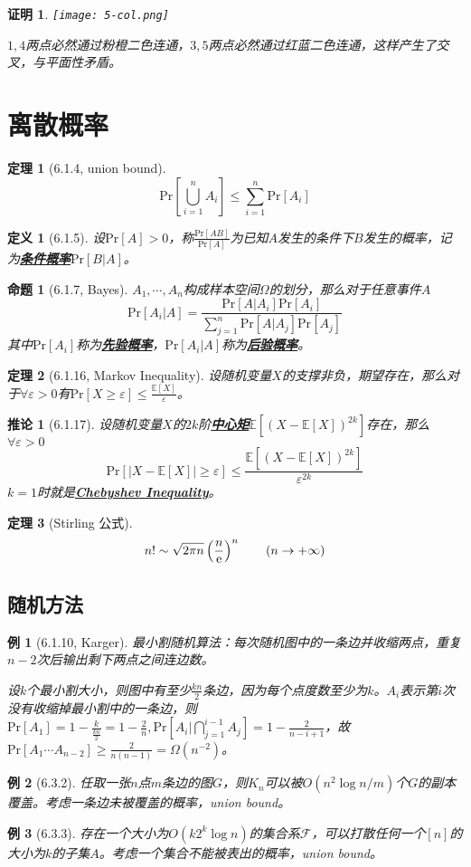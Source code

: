 \documentclass[landscape, a4paper]{article}
\theoremstyle{compact}
\newtheorem{theorem}{定理}
\newtheorem{example}{例}
\newtheorem{corollary}{推论}
\newtheorem{definition}{定义}
\newtheorem{proposition}{命题}
\newtheorem{Proof}{证明}
\def\obj#1{\textbf{\uline{#1}}}
\def\le{\leqslant}
\def\ge{\geqslant}
\def\Pr#1{\text{Pr}[{#1}]}
\def\E#1{\mathbb{E}[{#1}]}
\begin{document}
\begin{multicols}{3}
\begin{Proof}
	\texttt{[image: 5-col.png]}
	
	$1, 4$两点必然通过粉橙二色连通，$3, 5$两点必然通过红蓝二色连通，这样产生了交叉，与平面性矛盾。
\end{Proof}

\section{离散概率}
\begin{theorem}[6.1.4, union bound]
	$$\text{Pr}\left[\bigcup_{i=1}^{n}A_i\right] \le \sum_{i=1}^{n}\Pr{A_i}$$
\end{theorem}
\begin{definition}[6.1.5]
	设$\Pr{A} > 0$，称$\frac{\Pr{AB}}{\Pr{A}}$为已知$A$发生的条件下$B$发生的概率，记为\obj{条件概率}$\Pr{B|A}$。
\end{definition}
\begin{proposition}[6.1.7, Bayes]
	$A_1, \cdots, A_n$构成样本空间$\Omega$的划分，那么对于任意事件$A$
	$$\Pr{A_i | A} = \frac{\Pr{A | A_i}\Pr{A_i}}{\sum_{j=1}^{n}\Pr{A | A_j}\Pr{A_j}}$$
	其中$\Pr{A_i}$称为\obj{先验概率}，$\Pr{A_i | A}$称为\obj{后验概率}。
\end{proposition}
\begin{theorem}[6.1.16, Markov Inequality]
	设随机变量$X$的支撑非负，期望存在，那么对于$\forall \varepsilon > 0$有$\Pr{X \ge \varepsilon} \le \frac{\E{X}}{\varepsilon}$。
\end{theorem}
\begin{corollary}[6.1.17]
	设随机变量$X$的$2k$阶\obj{中心矩}$\E{(X - \E{X})^{2k}}$存在，那么$\forall \varepsilon > 0$$$\Pr{|X - \E{X}| \ge \varepsilon} \le \frac{\E{(X - \E{X})^{2k}}}{\varepsilon^{2k}}$$
	$k = 1$时就是\obj{Chebyshev Inequality}。
\end{corollary}
\begin{theorem}[Stirling 公式]
	$$n! \sim \sqrt{2\pi n}\left(\frac{n}{\text e}\right)^n \qquad (n \to +\infty)$$
\end{theorem}
\subsection{随机方法}
\begin{example}[6.1.10, Karger]
	最小割随机算法：每次随机图中的一条边并收缩两点，重复$n-2$次后输出剩下两点之间连边数。
	
	设$k$个最小割大小，则图中有至少$\frac{kn}{2}$条边，因为每个点度数至少为$k$。$A_i$表示第$i$次没有收缩掉最小割中的一条边，则$\Pr{A_1} = 1 - \frac{k}{\frac{kn}{2}} = 1 - \frac{2}{n}, \Pr{A_i | \bigcap_{j=1}^{i-1}A_j} = 1 - \frac{2}{n-i+1}$，故$\Pr{A_1\cdots A_{n-2}} \ge \frac{2}{n(n-1)} = \Omega(n^{-2})$。
\end{example}
\begin{example}[6.3.2]
	任取一张$n$点$m$条边的图$G$，则$K_n$可以被$O(n^2\log n / m)$个$G$的副本覆盖。\textit{考虑一条边未被覆盖的概率，union bound。}
\end{example}
\begin{example}[6.3.3]
	存在一个大小为$O(k2^k\log n)$的集合系$\mathcal F$，可以打散任何一个$[n]$的大小为$k$的子集$A$。\textit{考虑一个集合不能被表出的概率，union bound。}
\end{example}

\end{multicols}
\end{document}
